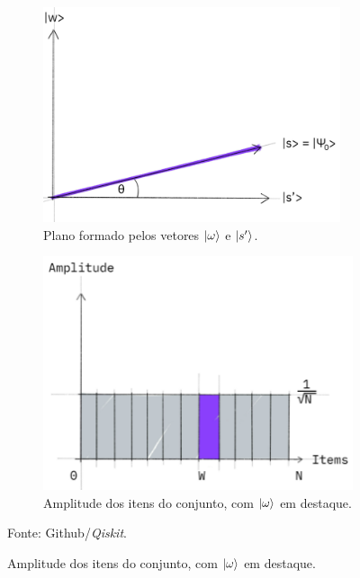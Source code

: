 \begin{figure}[ht!]
    \centering
    \caption{Plano Bidimensional e Amplitude dos estados da base.}
    \label{fig:espacoAmplitude}
    \begin{subfigure}[b]{0.4\textwidth}
        \centering
        \includegraphics[width=\textwidth]{Imagens/BidimensionalEspaco.png}
        \caption{Plano formado pelos vetores $\ket{\omega}$ e $\ket{s'}$.}
        \label{subfig:Plano}
    \end{subfigure}
    \hfill
    \begin{subfigure}[b]{0.45\textwidth}
        \centering
        \includegraphics[width=\textwidth]{Imagens/AmplitudesW.png}
        \caption{Amplitude dos itens do conjunto, com $\ket{\omega}$ em destaque.}
        \label{subfig:Amplitude}
    \end{subfigure}

    \vspace{0.3em}
    {\small Fonte: Github/\emph{Qiskit}.}
\end{figure}


